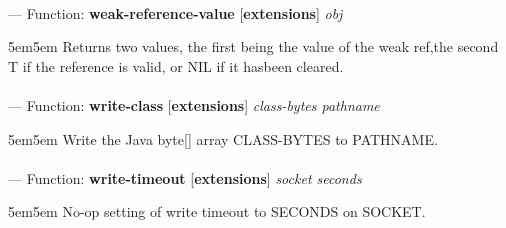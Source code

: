 \paragraph{}
\label{EXTENSIONS:WEAK-REFERENCE-VALUE}
--- Function: \textbf{weak-reference-value} [\textbf{extensions}] \textit{obj}

\begin{adjustwidth}{5em}{5em}
Returns two values, the first being the value of the weak ref,the second T if the reference is valid, or NIL if it hasbeen cleared.
\end{adjustwidth}

\paragraph{}
\label{EXTENSIONS:WRITE-CLASS}
--- Function: \textbf{write-class} [\textbf{extensions}] \textit{class-bytes pathname}

\begin{adjustwidth}{5em}{5em}
Write the Java byte[] array CLASS-BYTES to PATHNAME.
\end{adjustwidth}

\paragraph{}
\label{EXTENSIONS:WRITE-TIMEOUT}
--- Function: \textbf{write-timeout} [\textbf{extensions}] \textit{socket seconds}

\begin{adjustwidth}{5em}{5em}
No-op setting of write timeout to SECONDS on SOCKET.
\end{adjustwidth}

